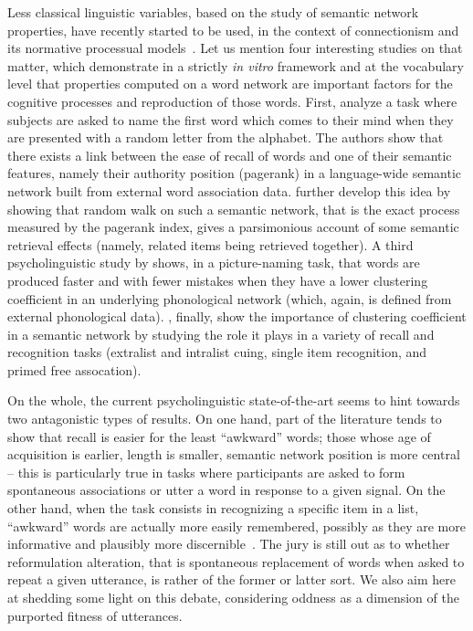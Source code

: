 Less classical linguistic variables, based on the study of semantic network properties, have recently started to be used, in the context of connectionism and its normative processual models~\citep[see for instance][]{collins1975spreading}.
Let us mention four interesting studies on that matter, which demonstrate in a strictly \emph{in vitro} framework and at the vocabulary level that properties computed on a word network are important factors for the cognitive processes and reproduction of those words.
First, \citet{Griffiths07} analyze a task where subjects are asked to name the first word which comes to their mind when they are presented with a random letter from the %
alphabet. The authors show that there exists a link between the ease of recall of words and one of their semantic features, namely their authority position (pagerank) in a language-wide semantic network built from external word association data.
\citet{austerweil2012human} further develop this idea by showing that random walk on such a semantic network, that is the exact process measured by the pagerank index, gives a parsimonious account of some semantic retrieval effects (namely, related items being retrieved together).
A third psycholinguistic study by \citet{Chan10} shows, in a picture-naming task, that words are produced faster and with fewer mistakes when they have a lower clustering coefficient in an underlying phonological network (which, again, is  defined from external phonological data).
\citet{nelson2013activation}, finally, show the importance of clustering coefficient in a semantic network by studying the role it plays in a variety of recall and recognition tasks (extralist and intralist cuing, single item recognition, and primed free assocation).

On the whole, the current psycholinguistic state-of-the-art seems to hint towards two antagonistic types of results.
On one hand, part of the literature tends to show that recall is easier for the least ``awkward'' words; those whose age of acquisition is earlier, length is smaller, semantic network position is more central -- this is particularly true in tasks where participants are asked to form spontaneous associations or utter a word in response to a given signal.
On the other hand, when the task consists in recognizing a specific item in a list, ``awkward'' words are actually more easily remembered, possibly as they are more informative and plausibly more discernible~\citep[see again][for a review]{Yonelinas02}.
The jury is still out as to whether reformulation alteration, that is spontaneous replacement of words when asked to repeat a given utterance, is rather of the former or latter sort.
We also aim here at shedding some light on this debate, considering oddness as a dimension of the purported fitness of utterances.
